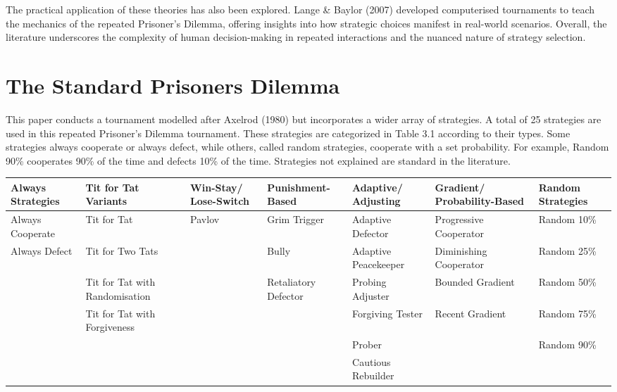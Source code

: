 \documentclass[11pt,preprint]{elsarticle}
\let\origtable\table
\let\endorigtable\endtable
\renewenvironment{table}[1][2] {
    \expandafter\origtable\expandafter[H]
} {
    \endorigtable
}
\numberwithin{equation}{section}
\numberwithin{figure}{section}
\numberwithin{table}{section}
\begin{document}
The practical application of these theories has also been explored.
Lange \& Baylor (2007) developed computerised tournaments to teach the
mechanics of the repeated Prisoner's Dilemma, offering insights into how
strategic choices manifest in real-world scenarios. Overall, the
literature underscores the complexity of human decision-making in
repeated interactions and the nuanced nature of strategy selection.

\section{The Standard Prisoners
Dilemma}\label{the-standard-prisoners-dilemma}

This paper conducts a tournament modelled after Axelrod (1980) but
incorporates a wider array of strategies. A total of 25 strategies are
used in this repeated Prisoner's Dilemma tournament. These strategies
are categorized in Table 3.1 according to their types. Some strategies
always cooperate or always defect, while others, called random
strategies, cooperate with a set probability. For example, Random 90\%
cooperates 90\% of the time and defects 10\% of the time. Strategies not
explained are standard in the literature.

\renewcommand{\arraystretch}{1.2} %
\begin{table}[ht]
\centering
\tiny %
\begin{tabular}{|>{\centering\arraybackslash}p{2cm}|>{\centering\arraybackslash}p{2cm}|>{\centering\arraybackslash}p{2cm}|>{\centering\arraybackslash}p{2cm}|>{\centering\arraybackslash}p{2cm}|>{\centering\arraybackslash}p{2cm}|>{\centering\arraybackslash}p{2cm}|}
\hline
\textbf{Always Strategies} & \textbf{Tit for Tat Variants} & \textbf{Win-Stay/ Lose-Switch} & \textbf{Punishment-Based} & \textbf{Adaptive/ Adjusting} & \textbf{Gradient/ Probability-Based} & \textbf{Random Strategies} \\
\hline
Always Cooperate & Tit for Tat & Pavlov\footnotemark & Grim Trigger & Adaptive Defector & Progressive Cooperator & Random 10\% \\
Always Defect & Tit for Two Tats & & Bully & Adaptive Peacekeeper & Diminishing Cooperator & Random 25\% \\
& Tit for Tat with Randomisation & & Retaliatory Defector & Probing Adjuster & Bounded Gradient & Random 50\% \\
& Tit for Tat with Forgiveness & & & Forgiving Tester & Recent Gradient & Random 75\% \\
& & & & Prober & & Random 90\% \\
& & & & Cautious Rebuilder & & \\
\hline
\end{tabular}
\caption{Categorisation of Strategy Types Used in the Prisoner's Dilemma Tournament}
\end{table}
\end{document}
